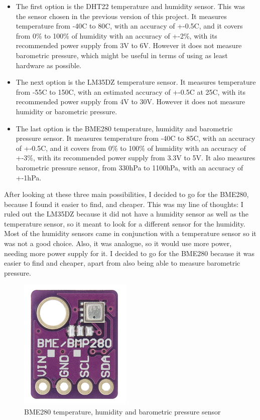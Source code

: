 \documentclass[12pt]{article}
\begin{document}
\begin{itemize}
    \item The first option is the DHT22 temperature and humidity sensor. This was the sensor chosen in the previous version of this project. It measures temperature from -40C to 80C, with an accuracy of +-0.5C, and it covers from 0\% to 100\% of humidity with an accuracy of +-2\%, with its recommended power supply from 3V to 6V. However it does not measure barometric pressure, which might be useful in terms of using as least hardware as possible.
    \item The next option is the LM35DZ temperature sensor. It measures temperature from -55C to 150C, with an estimated accuracy of +-0.5C at 25C, with its recommended power supply from 4V to 30V. However it does not measure humidity or barometric pressure.
    \item The last option is the BME280 temperature, humidity and barometric pressure sensor. It measures temperature from -40C to 85C, with an accuracy of +-0.5C, and it covers from 0\% to 100\% of humidity with an accuracy of +-3\%, with its recommended power supply from 3.3V to 5V. It also measures barometric pressure sensor, from 330hPa to 1100hPa, with an accuracy of +-1hPa.
\end{itemize}

After looking at these three main possibilities, I decided to go for the BME280, because I found it easier to find, and cheaper. This was my line of thoughts: I ruled out the LM35DZ because it did not have a humidity sensor as well as the temperature sensor, so it meant to look for a different sensor for the humidity. Most of the humidity sensors came in conjunction with a temperature sensor so it was not a good choice. Also, it was analogue, so it would use more power, needing more power supply for it. I decided to go for the BME280 because it was easier to find and cheaper, apart from also being able to measure barometric pressure.\par

\begin{figure}[h]
\label{fig:bme280}
\includegraphics[scale=0.25]{BMX280}
\centering
\caption{BME280 temperature, humidity and barometric pressure sensor}
\end{figure}
\end{document}
